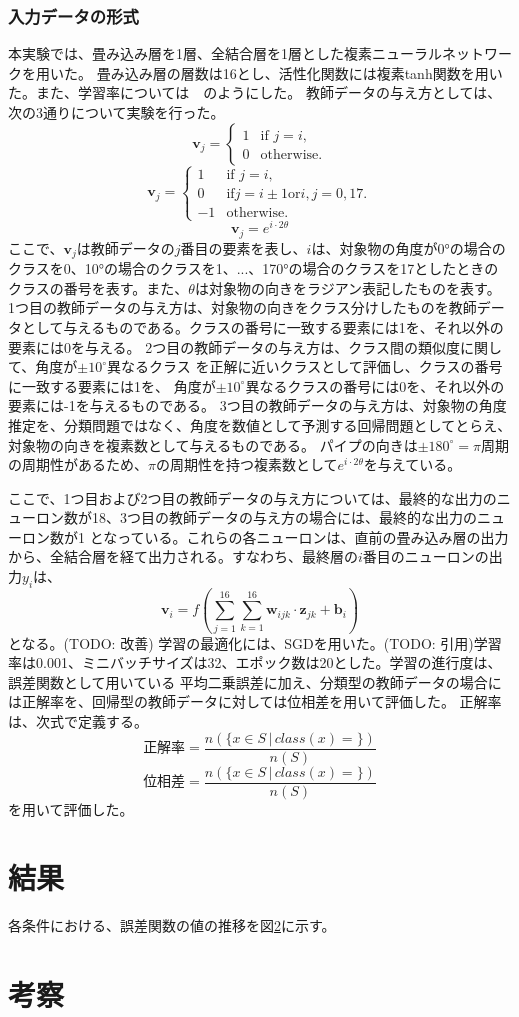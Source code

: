 \documentclass[11pt,a4paper,uplatex,draft]{ujarticle}
\begin{document}
  \subsubsection{入力データの形式}
  本実験では、畳み込み層を1層、全結合層を1層とした複素ニューラルネットワークを用いた。
  畳み込み層の層数は16とし、活性化関数には複素tanh関数を用いた。また、学習率については　のようにした。
  教師データの与え方としては、次の3通りについて実験を行った。
  \[
    \mathbf{v}_j =
    \begin{cases}
        1 & \text{if } j = i, \\
        0 & \text{otherwise}.
    \end{cases}
  \]
  \[
    \mathbf{v}_j =
    \begin{cases}
        1 & \text{if } j = i, \\
        0 & \text{if} j = i \pm 1 \text{or} {i, j} = {0, 17}.\\
        -1 & \text{otherwise}.
    \end{cases}
  \]
  \[
    \mathbf{v}_j = e^{i\cdot2\theta}
  \]
  ここで、$\mathbf{v}_j$は教師データの$j$番目の要素を表し、$i$は、対象物の角度が0°の場合のクラスを0、10°の場合のクラスを1、...、170°の場合のクラスを17としたときの
  クラスの番号を表す。また、$\theta$は対象物の向きをラジアン表記したものを表す。
  1つ目の教師データの与え方は、対象物の向きをクラス分けしたものを教師データとして与えるものである。クラスの番号に一致する要素には1を、それ以外の要素には0を与える。
  2つ目の教師データの与え方は、クラス間の類似度に関して、角度が$\pm10^{\circ}$異なるクラス
  を正解に近いクラスとして評価し、クラスの番号に一致する要素には1を、 角度が$\pm10^{\circ}$異なるクラスの番号には0を、それ以外の要素には-1を与えるものである。
  3つ目の教師データの与え方は、対象物の角度推定を、分類問題ではなく、角度を数値として予測する回帰問題としてとらえ、対象物の向きを複素数として与えるものである。
  パイプの向きは$\pm180^{\circ} = \pi$周期の周期性があるため、$\pi$の周期性を持つ複素数として$e^{i\cdot2\theta}$を与えている。

  ここで、1つ目および2つ目の教師データの与え方については、最終的な出力のニューロン数が18、3つ目の教師データの与え方の場合には、最終的な出力のニューロン数が1
  となっている。これらの各ニューロンは、直前の畳み込み層の出力から、全結合層を経て出力される。すなわち、最終層の$i$番目のニューロンの出力$y_i$は、
  \[
    \mathbf{v}_i = f(\sum_{j=1}^{16} \sum_{k=1}^{16} \mathbf{w}_{ijk} \cdot \mathbf{z}_{jk} + \mathbf{b}_i)
  \]
  となる。(TODO: 改善)
  学習の最適化には、SGDを用いた。(TODO: 引用)学習率は0.001、ミニバッチサイズは32、エポック数は20とした。学習の進行度は、誤差関数として用いている
  平均二乗誤差に加え、分類型の教師データの場合には正解率を、回帰型の教師データに対しては位相差を用いて評価した。
  正解率は、次式で定義する。
  \[
    \text{正解率} = \frac{n(\{x \in S \, |\, class(x) = \})}{n(S)}
  \] %
  \[
    \text{位相差} = \frac{n(\{x \in S \, |\, class(x) = \})}{n(S)}
  \] %
  を用いて評価した。

\section{結果}
  各条件における、誤差関数の値の推移を図\ref{}に示す。
  
\section{考察}
  




\end{document}
